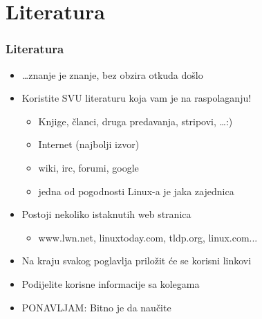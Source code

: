 \documentclass{beamer}
\begin{document}
\section{Literatura}
\begin{frame}[t]
\frametitle{Literatura}
\begin{itemize}
	\item \ldots znanje je znanje, bez obzira otkuda došlo
	\item Koristite SVU literaturu koja vam je na raspolaganju!
	\begin{itemize}
		\item Knjige, članci, druga predavanja, stripovi, \ldots :)
		\item Internet (najbolji izvor)
		\item wiki, irc, forumi, google 
		\item jedna od pogodnosti Linux-a je jaka zajednica
	\end{itemize}
	\item Postoji nekoliko istaknutih web stranica
	\begin{itemize}
		\item www.lwn.net, linuxtoday.com, tldp.org, linux.com...
	\end{itemize}
	\item Na kraju svakog poglavlja priložit će se korisni linkovi
	\item Podijelite korisne informacije sa kolegama
	\item PONAVLJAM: Bitno je da naučite
\end{itemize}
\end{frame}
\end{document}
